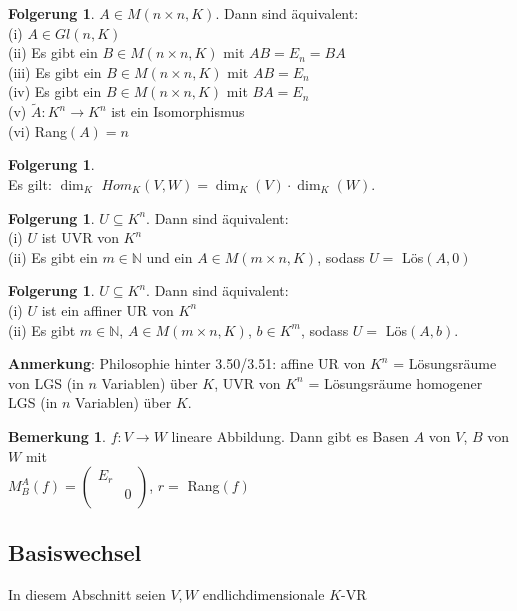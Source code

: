 \documentclass[10pt,a4paper,numbers=endperiod]{scrartcl}
\theoremstyle{definition}
\newtheorem{bem}[satz]{Bemerkung}
\newtheorem{folg}[satz]{Folgerung}
\def\NN{{\mathbb N}}
\begin{document}
\begin{folg}
	$A \in M(n \times n,K)$. Dann sind äquivalent:\\
(i) $A \in Gl(n,K)$\\
(ii) Es gibt ein $B \in M(n \times n,K)$ mit $AB=E_n=BA$\\
(iii) Es gibt ein $B \in M(n \times n,K)$ mit $AB = E_n$\\
(iv) Es gibt ein $B \in M(n \times n,K)$ mit $BA=E_n$\\
(v) $\tilde{A}:K^n \rightarrow K^n$ ist ein Isomorphismus\\
(vi) Rang$(A) = n$
\end{folg}

\begin{folg}
	$ $\\
	Es gilt: $\dim_K$ $Hom_K(V,W) = \dim_K (V) \cdot \dim_K (W)$.
\end{folg}

\begin{folg}
	$U \subseteq K^n$. Dann sind äquivalent:\\
	(i) $U$ ist UVR von $K^n$\\
	(ii) Es gibt ein $m \in \NN$ und ein $A \in M(m\times n,K)$, sodass $U=$ Lös$(A,0)$
\end{folg}

\begin{folg}
	$U \subseteq K^n$. Dann sind äquivalent:\\
	(i) $U$ ist ein affiner UR von $K^n$\\
	(ii) Es gibt $m \in \NN$, $A \in M(m \times n,K)$, $b \in K^m$, sodass $U =$ Lös$(A,b)$.
\end{folg}

\textbf{Anmerkung}: Philosophie hinter 3.50/3.51: affine UR von $K^n$ = Lösungsräume von LGS (in $n$ Variablen) über $K$, UVR von $K^n$ = Lösungsräume homogener LGS (in $n$ Variablen) über $K$.

\begin{bem}
	$f: V \rightarrow W$ lineare Abbildung. Dann gibt es Basen $A$ von $V$, $B$ von $W$ mit\\
	$M_B^A (f) = \begin{pmatrix}
	E_r&\\
	&0\\
	\end{pmatrix}$, $r=$ Rang$(f)$
\end{bem}

\subsection{Basiswechsel}
In diesem Abschnitt seien $V,W$ endlichdimensionale $K$-VR
\end{document}
